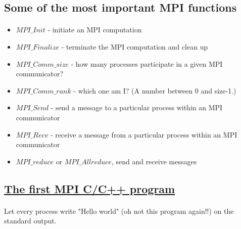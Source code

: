 \documentclass[%
oneside,                 %
final,                   %
10pt]{article}
\begin{document}
\subsection{Some of the most  important MPI functions}

\paragraph{}

\begin{itemize}
\item $MPI\_Init$ - initiate an MPI computation

\item $MPI\_Finalize$ - terminate the MPI computation and clean up

\item $MPI\_Comm\_size$ - how many processes participate in a given MPI communicator?

\item $MPI\_Comm\_rank$ - which one am I? (A number between 0 and size-1.)

\item $MPI\_Send$ - send a message to a particular process within an MPI communicator

\item $MPI\_Recv$ - receive a message from a particular process within an MPI communicator

\item $MPI\_reduce$  or $MPI\_Allreduce$, send and receive messages
\end{itemize}

\noindent



\subsection{\href{{https://github.com/CompPhysics/ComputationalPhysics2/blob/gh-pages/doc/Programs/LecturePrograms/programs/MPI/chapter07/program2.cpp}}{The first MPI C/C++ program}}

\paragraph{}

Let every process write "Hello world" (oh not this program again!!) on the standard output. 
\end{document}
